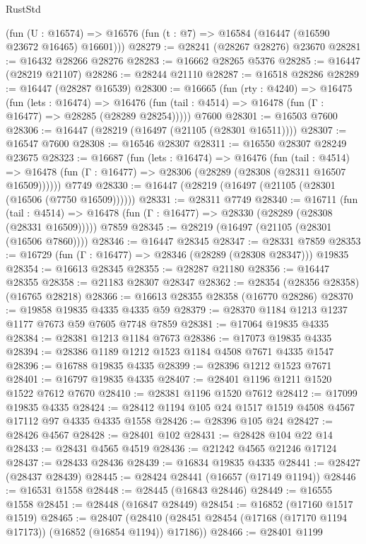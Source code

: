 \begin{lexlean}{RustStd}
\begin{coremodule}
    (fun (U : @16574) => @16576 (fun (t : @7) => @16584 (@16447 (@16590 @23672 @16465) @16601)))
@28279 := @28241 (@28267 @28276) @23670
@28281 := @16432 @28266 @28276
@28283 := @16662 @28265 @5376
@28285 := @16447 (@28219 @21107)
@28286 := @28244 @21110
@28287 := @16518 @28286
@28289 := @16447 (@28287 @16539)
@28300 := @16665
    (fun (rty : @4240) =>
    @16475
      (fun (lets : @16474) =>
      @16476 (fun (tail : @4514) => @16478 (fun (Γ : @16477) => @28285 (@28289 @28254)))))
    @7600
@28301 := @16503 @7600
@28306 := @16447 (@28219 (@16497 (@21105 (@28301 @16511))))
@28307 := @16547 @7600
@28308 := @16546 @28307
@28311 := @16550 @28307 @28249 @23675
@28323 := @16687
    (fun (lets : @16474) =>
    @16476
      (fun (tail : @4514) =>
      @16478 (fun (Γ : @16477) => @28306 (@28289 (@28308 (@28311 @16507 @16509))))))
    @7749
@28330 := @16447 (@28219 (@16497 (@21105 (@28301 (@16506 (@7750 @16509))))))
@28331 := @28311 @7749
@28340 := @16711
    (fun (tail : @4514) => @16478 (fun (Γ : @16477) => @28330 (@28289 (@28308 (@28331 @16509)))))
    @7859
@28345 := @28219 (@16497 (@21105 (@28301 (@16506 @7860))))
@28346 := @16447 @28345
@28347 := @28331 @7859
@28353 := @16729 (fun (Γ : @16477) => @28346 (@28289 (@28308 @28347))) @19835
@28354 := @16613 @28345
@28355 := @28287 @21180
@28356 := @16447 @28355
@28358 := @21183 @28307 @28347
@28362 := @28354 (@28356 @28358) (@16765 @28218)
@28366 := @16613 @28355 @28358 (@16770 @28286)
@28370 := @19858 @19835 @4335 @4335 @59
@28379 := @28370 @1184 @1213 @1237 @1177 @7673 @59 @7605 @7748 @7859
@28381 := @17064 @19835 @4335
@28384 := @28381 @1213 @1184 @7673
@28386 := @17073 @19835 @4335
@28394 := @28386 @1189 @1212 @1523 @1184 @4508 @7671 @4335 @1547
@28396 := @16788 @19835 @4335
@28399 := @28396 @1212 @1523 @7671
@28401 := @16797 @19835 @4335
@28407 := @28401 @1196 @1211 @1520 @1522 @7612 @7670
@28410 := @28381 @1196 @1520 @7612
@28412 := @17099 @19835 @4335
@28424 := @28412 @1194 @105 @24 @1517 @1519 @4508 @4567 @17112 @97 @4335 @4335 @1558
@28426 := @28396 @105 @24
@28427 := @28426 @4567
@28428 := @28401 @102
@28431 := @28428 @104 @22 @14
@28433 := @28431 @4565 @4519
@28436 := @21242 @4565 @21246 @17124
@28437 := @28433 @28436
@28439 := @16834 @19835 @4335
@28441 := @28427 (@28437 @28439)
@28445 := @28424 @28441 (@16657 (@17149 @1194))
@28446 := @16531 @1558
@28448 := @28445 (@16843 @28446)
@28449 := @16555 @1558
@28451 := @28448 (@16847 @28449)
@28454 := @16852 (@17160 @1517 @1519)
@28465 := @28407
    (@28410 (@28451 @28454 (@17168 (@17170 @1194 @17173)) (@16852 (@16854 @1194)) @17186))
@28466 := @28401 @1199

\end{coremodule}
\end{lexlean}
